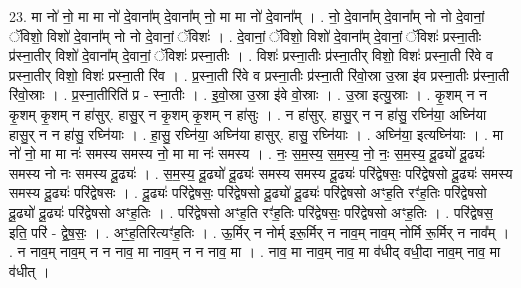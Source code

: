 \documentclass[17pt]{extarticle}
\begin{document}
23. मा नो॑ नो॒ मा मा नो॑ दे॒वाना᳚म् दे॒वाना᳚म् नो॒ मा मा नो॑ दे॒वाना᳚म् । . नो॒ दे॒वाना᳚म् दे॒वाना᳚म् नो नो दे॒वानां॒ ॅविशो॒ विशो॑ दे॒वाना᳚म् नो नो दे॒वानां॒ ॅविशः॑ । . दे॒वानां॒ ॅविशो॒ विशो॑ दे॒वाना᳚म् दे॒वानां॒ ॅविशः॑ प्रस्ना॒तीः प्र॑स्ना॒तीर् विशो॑ दे॒वाना᳚म् दे॒वानां॒ ॅविशः॑ प्रस्ना॒तीः । . विशः॑ प्रस्ना॒तीः प्र॑स्ना॒तीर् विशो॒ विशः॑ प्रस्ना॒ती रि॑वे व प्रस्ना॒तीर् विशो॒ विशः॑ प्रस्ना॒ती रि॑व । . प्र॒स्ना॒ती रि॑वे व प्रस्ना॒तीः प्र॑स्ना॒ती रि॑वो॒स्रा उ॒स्रा इ॑व प्रस्ना॒तीः प्र॑स्ना॒ती रि॑वो॒स्राः । . प्र॒स्ना॒तीरिति॑ प्र - स्ना॒तीः । . इ॒वो॒स्रा उ॒स्रा इ॑वे वो॒स्राः । . उ॒स्रा इत्यु॒स्राः । . कृ॒शम् न न कृ॒शम् कृ॒शम् न हा॑सुर्. हासु॒र् न कृ॒शम् कृ॒शम् न हा॑सुः । . न हा॑सुर्. हासु॒र् न न हा॑सु॒ रघ्नि॑या॒ अघ्नि॑या हासु॒र् न न हा॑सु॒ रघ्नि॑याः । . हा॒सु॒ रघ्नि॑या॒ अघ्नि॑या हासुर्. हासु॒ रघ्नि॑याः । . अघ्नि॑या॒ इत्यघ्नि॑याः । . मा नो॑ नो॒ मा मा नः॑ समस्य समस्य नो॒ मा मा नः॑ समस्य । . नः॒ स॒म॒स्य॒ स॒म॒स्य॒ नो॒ नः॒ स॒म॒स्य॒ दू॒ढ्यो॑ दू॒ढ्यः॑ समस्य नो नः समस्य दू॒ढ्यः॑ । . स॒म॒स्य॒ दू॒ढ्यो॑ दू॒ढ्यः॑ समस्य समस्य दू॒ढ्यः॑ परि॑द्वेषसः॒ परि॑द्वेषसो दू॒ढ्यः॑ समस्य समस्य दू॒ढ्यः॑ परि॑द्वेषसः । . दू॒ढ्यः॑ परि॑द्वेषसः॒ परि॑द्वेषसो दू॒ढ्यो॑ दू॒ढ्यः॑ परि॑द्वेषसो अꣳह॒ति रꣳ॑ह॒तिः परि॑द्वेषसो दू॒ढ्यो॑ दू॒ढ्यः॑ परि॑द्वेषसो अꣳह॒तिः । . परि॑द्वेषसो अꣳह॒ति रꣳ॑ह॒तिः परि॑द्वेषसः॒ परि॑द्वेषसो अꣳह॒तिः । . परि॑द्वेषस॒ इति॒ परि॑ - द्वे॒ष॒सः॒ । . अꣳ॒॒ह॒तिरित्यꣳ॑ह॒तिः । . ऊ॒र्मिर् न नोर्म् इरू॒र्मिर् न नाव॒म् नाव॒म् नोर्मि रू॒र्मिर् न नाव᳚म् । . न नाव॒म् नाव॒म् न न नाव॒ मा नाव॒म् न न नाव॒ मा । . नाव॒ मा नाव॒म् नाव॒ मा व॑धीद् वधी॒दा नाव॒म् नाव॒ मा व॑धीत् । \newline
\end{document}
